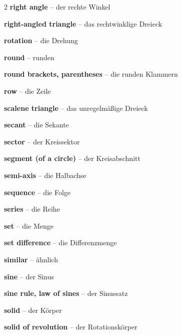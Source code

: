 \begin{multicols}{2}
\textbf{right angle} -- der rechte Winkel\dotfill\hyperref[e:158]{\pageref*{e:158}}\par
\textbf{right-angled triangle} -- das rechtwinklige Dreieck\dotfill\hyperref[e:181]{\pageref*{e:181}}\par
\textbf{rotation} -- die Drehung\dotfill\hyperref[e:174]{\pageref*{e:174}}\par
\textbf{round} -- runden\dotfill\hyperref[e:59]{\pageref*{e:59}}\par
\textbf{round brackets, parentheses} -- die runden Klammern\dotfill\hyperref[e:88]{\pageref*{e:88}}\par
\textbf{row} -- die Zeile\dotfill\hyperref[e:322]{\pageref*{e:322}}\par

\par\nopagebreak
\textbf{scalene triangle} -- das unregelmäßige Dreieck\dotfill\hyperref[e:180]{\pageref*{e:180}}\par
\textbf{secant} -- die Sekante\dotfill\hyperref[e:219]{\pageref*{e:219}}\par
\textbf{sector} -- der Kreissektor\dotfill\hyperref[e:217]{\pageref*{e:217}}\par
\textbf{segment (of a circle)} -- der Kreisabschnitt\dotfill\hyperref[e:222]{\pageref*{e:222}}\par
\textbf{semi-axis} -- die Halbachse\dotfill\hyperref[e:317]{\pageref*{e:317}}\par
\textbf{sequence} -- die Folge\dotfill\hyperref[e:257]{\pageref*{e:257}}\par
\textbf{series} -- die Reihe\dotfill\hyperref[e:265]{\pageref*{e:265}}\par
\textbf{set} -- die Menge\dotfill\hyperref[e:96]{\pageref*{e:96}}\par
\textbf{set difference} -- die Differenzmenge\dotfill\hyperref[e:102]{\pageref*{e:102}}\par
\textbf{similar} -- ähnlich\dotfill\hyperref[e:176]{\pageref*{e:176}}\par
\textbf{sine} -- der Sinus\dotfill\hyperref[e:132]{\pageref*{e:132}}\par
\textbf{sine rule, law of sines} -- der Sinussatz\dotfill\hyperref[e:140]{\pageref*{e:140}}\par
\textbf{solid} -- der Körper\dotfill\hyperref[e:225]{\pageref*{e:225}}\par
\textbf{solid of revolution} -- der Rotationskörper\dotfill\hyperref[e:239]{\pageref*{e:239}}\par

\end{multicols}
